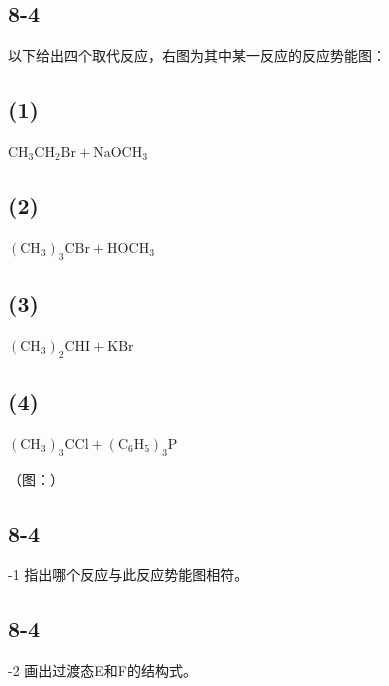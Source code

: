 \subsection*{8-4}
以下给出四个取代反应，右图为其中某⼀反应的反应势能图：

\subsection*{(1)}
$\mathrm { C H _ { 3 } C H _ { 2 } B r + N a O C H _ { 3 }  }$

\subsection*{(2)}
$\mathrm { ( C H _ { 3 } ) _ { 3 } C B r + H O C H _ { 3 }  }$

\subsection*{(3)}
$( \mathrm { C H _ { 3 } } ) _ { 2 } \mathrm { C H I } + \mathrm { K B r } $

\subsection*{(4)}
$\mathrm { ( C H _ { 3 } ) _ { 3 } C C l + ( C _ { 6 } H _ { 5 } ) _ { 3 } P  }$

（图：）

\subsection*{8-4}
-1 指出哪个反应与此反应势能图相符。

\subsection*{8-4}
-2 画出过渡态E和F的结构式。
